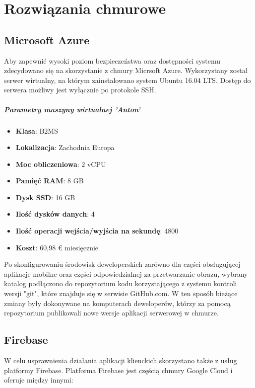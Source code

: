 \chapter{Rozwiązania chmurowe}

\section{Microsoft Azure}

Aby zapewnić wysoki poziom bezpieczeństwa oraz dostępności systemu zdecydowano się na skorzystanie z chmury Micrsoft Azure.
Wykorzystany został serwer wirtualny, na którym zainstalowano system Ubuntu 16.04 LTS. Dostęp do serwera możliwy jest wyłącznie po protokole SSH.

\paragraph{Parametry maszyny wirtualnej 'Anton'}
\begin{itemize}
    \item \textbf{Klasa}: B2MS
    \item \textbf{Lokalizacja}: Zachodnia Europa
    \item \textbf{Moc obliczeniowa}: 2 vCPU
    \item \textbf{Pamięć RAM}: 8 GB
    \item \textbf{Dysk SSD}: 16 GB
    \item \textbf{Ilość dysków danych}: 4
    \item \textbf{Ilość operacji wejścia/wyjścia na sekundę}: 4800
    \item \textbf{Koszt}: 60,98 € miesięcznie
\end{itemize}

Po skonfigurowaniu środowisk deweloperskich zarówno dla części obsługującej aplikacje mobilne oraz części odpowiedzialnej za przetwarzanie obrazu, wybrany katalog podłączono do repozytorium kodu korzystającego z systemu kontroli wersji  "git", które znajduje się w serwisie GitHub.com.
W ten sposób bieżące zmiany były dokonywane na komputerach deweloperów, którzy za pomocą repozytorium publikowali nowe wersje aplikacji serwerowej w chmurze.

\section{Firebase}

W celu usprawnienia działania aplikacji klienckich skorzystano także z usług platformy Firebase. Platforma Firebase jest częścią chmury Google Cloud i oferuje między innymi:

